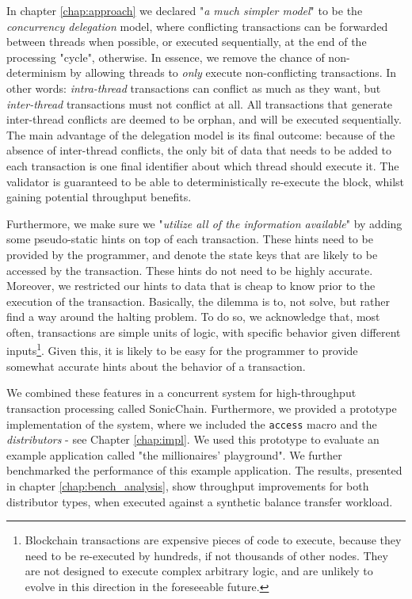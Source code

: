 In chapter \ref{chap:approach} we declared "\textit{a much simpler model}" to be the
\textit{concurrency delegation} model, where conflicting transactions can be forwarded between
threads when possible, or executed sequentially, at the end of the processing "cycle", otherwise. In
essence, we remove the chance of non-determinism by allowing threads to \textit{only} execute
non-conflicting transactions. In other words: \textit{intra-thread} transactions can conflict as
much as they want, but \textit{inter-thread} transactions must not conflict at all. All transactions
that generate inter-thread conflicts are deemed to be orphan, and will be executed sequentially. The
main advantage of the delegation model is its final outcome: because of the absence of inter-thread
conflicts, the only bit of data that needs to be added to each transaction is one final identifier
about which thread should execute it. The validator is guaranteed to be able to deterministically
re-execute the block, whilst gaining potential throughput benefits.

Furthermore, we make sure we "\textit{utilize all of the information available}" by adding some
pseudo-static hints on top of each transaction. These hints need to be provided by the programmer,
and denote the state keys that are likely to be accessed by the transaction. These hints do not need
to be highly accurate. Moreover, we restricted our hints to data that is cheap to know prior to the
execution of the transaction. Basically, the dilemma is to, not solve, but rather find a way around
the halting problem\cite{burkholderHaltingProblem1987}. To do so, we acknowledge that, most often,
transactions are simple units of logic, with specific behavior given different
inputs\footnote{Blockchain transactions are expensive pieces of code to execute, because they need
to be re-executed by hundreds, if not thousands of other nodes. They are not designed to execute
complex arbitrary logic, and are unlikely to evolve in this direction in the foreseeable future.}.
Given this, it is likely to be easy for the programmer to provide somewhat accurate hints about the
behavior of a transaction.

We combined these features in a concurrent system for high-throughput transaction processing called
SonicChain. Furthermore, we provided a prototype implementation of the system, where we included the
\texttt{access} macro and the \textit{distributors} - see Chapter \ref{chap:impl}. We used this
prototype to evaluate an example application called "the millionaires' playground". We further
benchmarked the performance of this example application. The results, presented in chapter
\ref{chap:bench_analysis}, show throughput improvements for both distributor types, when executed
against a synthetic balance transfer workload.

